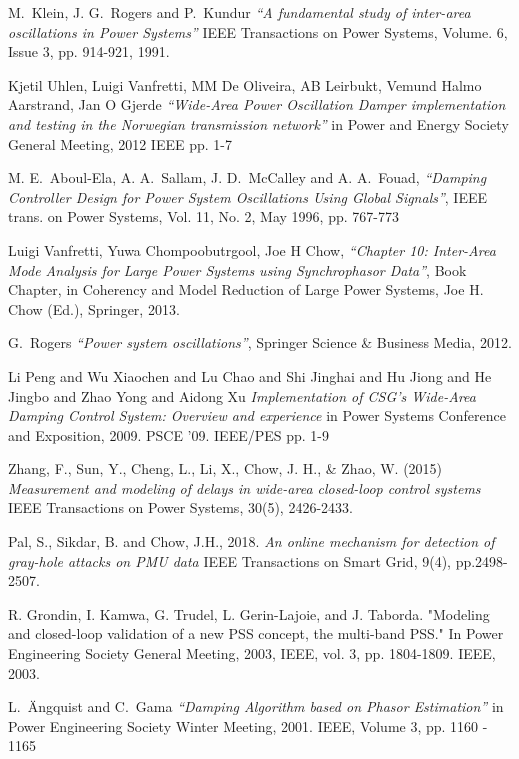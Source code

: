 \documentclass{ieeeaccess}
\begin{document}
\begin{thebibliography}{00}


M.~Klein, J. G.~Rogers and P.~Kundur \emph{``A fundamental study of inter-area oscillations in Power Systems''}  IEEE Transactions on Power Systems, Volume. 6, Issue 3, pp. 914-921, 1991. 

 Kjetil Uhlen, Luigi Vanfretti, MM De Oliveira, AB Leirbukt, Vemund Halmo Aarstrand, Jan O Gjerde \emph{``Wide-Area Power Oscillation Damper implementation and testing in the Norwegian transmission network''} in Power and Energy Society General Meeting, 2012 IEEE pp. 1-7

  M. E.~Aboul-Ela, A. A.~Sallam, J. D.~McCalley and A. A.~Fouad, \emph{``Damping Controller Design for Power System Oscillations Using Global Signals''}, IEEE trans. on Power Systems, Vol. 11, No. 2, May 1996, pp. 767-773

  Luigi Vanfretti, Yuwa Chompoobutrgool, Joe H Chow, \emph{``Chapter 10: Inter-Area Mode Analysis for Large Power Systems using Synchrophasor Data''}, Book Chapter, in Coherency and Model Reduction of Large Power Systems, Joe H. Chow (Ed.), Springer, 2013.

 G.~Rogers \emph{``Power system oscillations''}, Springer Science \& Business Media, 2012. 

 Li Peng and Wu Xiaochen and Lu Chao and Shi Jinghai and Hu Jiong and He Jingbo and Zhao Yong and Aidong Xu \emph{Implementation of CSG's Wide-Area Damping Control System: Overview and experience} in Power Systems Conference and Exposition, 2009. PSCE '09. IEEE/PES pp. 1-9

 Zhang, F., Sun, Y., Cheng, L., Li, X., Chow, J. H., \& Zhao, W. (2015) \emph{Measurement and modeling of delays in wide-area closed-loop control systems} IEEE Transactions on Power Systems, 30(5), 2426-2433.

 Pal, S., Sikdar, B. and Chow, J.H., 2018. \emph{An online mechanism for detection of gray-hole attacks on PMU data} IEEE Transactions on Smart Grid, 9(4), pp.2498-2507.

 R. Grondin, I. Kamwa, G. Trudel, L. Gerin-Lajoie, and J. Taborda. "Modeling and closed-loop validation of a new PSS concept, the multi-band PSS." In Power Engineering Society General Meeting, 2003, IEEE, vol. 3, pp. 1804-1809. IEEE, 2003.

L.~\"{A}ngquist and C.~Gama  \emph{``Damping Algorithm based on Phasor Estimation''} in Power Engineering Society Winter Meeting, 2001. IEEE, Volume 3, pp. 1160 - 1165  


\end{thebibliography}
\end{document}
